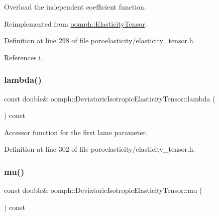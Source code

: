 Overload the independent coefficient function. 



Reimplemented from \hyperlink{classoomph_1_1ElasticityTensor_a84b2a9b7a447cf88b2d6b98b5e6e7bd5}{oomph\+::\+Elasticity\+Tensor}.



Definition at line 298 of file poroelasticity/elasticity\+\_\+tensor.\+h.



References i.

\mbox{\label{classoomph_1_1DeviatoricIsotropicElasticityTensor_a6fe87541b96eae240e41bc71515500b1}} 
\subsubsection{\texorpdfstring{lambda()}{lambda()}}
{\footnotesize\ttfamily const double\& oomph\+::\+Deviatoric\+Isotropic\+Elasticity\+Tensor\+::lambda (\begin{DoxyParamCaption}{ }\end{DoxyParamCaption}) const\hspace{0.3cm}{\ttfamily [inline]}}



Accessor function for the first lame parameter. 



Definition at line 302 of file poroelasticity/elasticity\+\_\+tensor.\+h.

\mbox{\label{classoomph_1_1DeviatoricIsotropicElasticityTensor_ab460459ac81142a79e16ef2229d04b43}} 
\subsubsection{\texorpdfstring{mu()}{mu()}}
{\footnotesize\ttfamily const double\& oomph\+::\+Deviatoric\+Isotropic\+Elasticity\+Tensor\+::mu (\begin{DoxyParamCaption}{ }\end{DoxyParamCaption}) const\hspace{0.3cm}{\ttfamily [inline]}}




